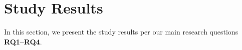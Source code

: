 \section{Study Results}\label{sec:results}
In this section, we present the study results per our main research questions \textbf{RQ1--RQ4}.


\begin{table*}[t!]
    \centering
    \caption{Check for understanding.}
    \label{tab:cfu-results}
\end{table*}

